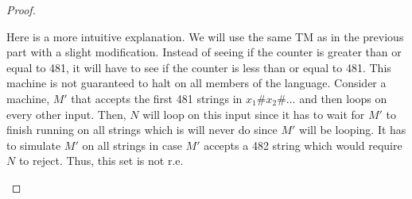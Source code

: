 \documentclass{article}
\theoremstyle{definition}
\begin{document}
\begin{enumerate}
\begin{proof}
\begin{enumerate}
			 Here is a more intuitive explanation. We will use the same TM as in the previous part with a slight modification. Instead of seeing if the counter is greater than or equal to 481, it will have to see if the counter is less than or equal to 481. This machine is not guaranteed to halt on all members of the language. Consider a machine, $M'$ that accepts the first 481 strings in $x_1\#x_2\#\ldots$ and then loops on every other input. Then, $N$ will loop on this input since it has to wait for $M'$ to finish running on all strings which is will never do since $M'$ will be looping. It has to simulate $M'$ on all strings in case $M'$ accepts a 482 string which would require $N$ to reject. Thus, this set is not r.e.
		\end{enumerate}
	\end{proof}
\end{enumerate}
\end{document}
